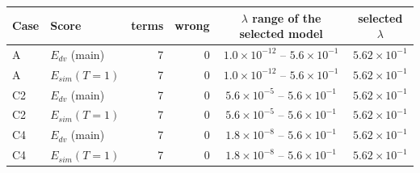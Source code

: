 \begin{tabular}{llrrcc}\toprule Case & Score & terms & wrong & $\lambda$ range of the selected model & selected $\lambda$\\\midrule
A & $E_{dv}$ (main) & 7 & 0 & $1.0\!\times\!10^{-12}$ -- $5.6\!\times\!10^{-1}$ & $5.62\!\times\!10^{-1}$\\
A & $E_{sim}(T{=}1)$ & 7 & 0 & $1.0\!\times\!10^{-12}$ -- $5.6\!\times\!10^{-1}$ & $5.62\!\times\!10^{-1}$\\
C2 & $E_{dv}$ (main) & 7 & 0 & $5.6\!\times\!10^{-5}$ -- $5.6\!\times\!10^{-1}$ & $5.62\!\times\!10^{-1}$\\
C2 & $E_{sim}(T{=}1)$ & 7 & 0 & $5.6\!\times\!10^{-5}$ -- $5.6\!\times\!10^{-1}$ & $5.62\!\times\!10^{-1}$\\
C4 & $E_{dv}$ (main) & 7 & 0 & $1.8\!\times\!10^{-8}$ -- $5.6\!\times\!10^{-1}$ & $5.62\!\times\!10^{-1}$\\
C4 & $E_{sim}(T{=}1)$ & 7 & 0 & $1.8\!\times\!10^{-8}$ -- $5.6\!\times\!10^{-1}$ & $5.62\!\times\!10^{-1}$\\
\bottomrule\end{tabular}